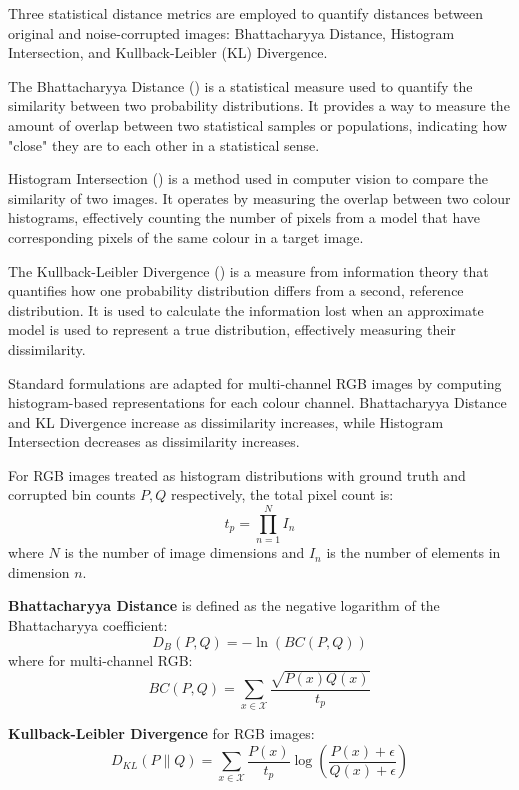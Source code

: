 Three statistical distance metrics are employed to quantify distances between original and noise-corrupted images: Bhattacharyya Distance, Histogram Intersection, and Kullback-Leibler (KL) Divergence. 

The Bhattacharyya Distance (\cite{bhattacharyya1943}) is a statistical measure used to quantify the similarity between two probability distributions. It provides a way to measure the amount of overlap between two statistical samples or populations, indicating how "close" they are to each other in a statistical sense.

Histogram Intersection (\cite{swain1991}) is a method used in computer vision to compare the similarity of two images. It operates by measuring the overlap between two colour histograms, effectively counting the number of pixels from a model that have corresponding pixels of the same colour in a target image. 

The Kullback-Leibler Divergence (\cite{kullback1951}) is a measure from information theory that quantifies how one probability distribution differs from a second, reference distribution. It is used to calculate the information lost when an approximate model is used to represent a true distribution, effectively measuring their dissimilarity. 

Standard formulations are adapted for multi-channel RGB images by computing histogram-based representations for each colour channel. Bhattacharyya Distance and KL Divergence increase as dissimilarity increases, while Histogram Intersection decreases as dissimilarity increases.

For RGB images treated as histogram distributions with ground truth and corrupted bin counts $P,Q$ respectively, the total pixel count is:
\begin{equation}
\label{eq:t_p}
  t_p = \prod\limits_{n=1}^{N}I_n   
\end{equation}
where $N$ is the number of image dimensions and $I_n$ is the number of elements in dimension $n$.

\textbf{Bhattacharyya Distance} is defined as the negative logarithm of the Bhattacharyya coefficient:
\begin{equation}
    D_{B}(P,Q) = -\ln(BC(P,Q))
\end{equation}
where for multi-channel RGB:
\begin{equation}
BC(P,Q) = \sum\limits_{x\in \mathcal{X}} \frac{\sqrt{P(x)Q(x)}}{t_p}
\end{equation}

\textbf{Kullback-Leibler Divergence} for RGB images:
\begin{equation}
 D_{KL}(P \parallel Q) = \sum\limits_{x\in\mathcal{X}} \frac{P(x)}{t_p} \log\left(\frac{P(x)+\epsilon}{Q(x)+\epsilon}\right)
\end{equation}

